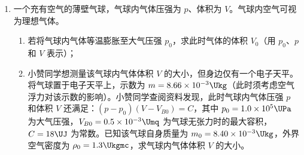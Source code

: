 \documentclass[\gkver]{gaokaozhenti}
\begin{document}
\begin{enumerate}
{\begin{enumerate}
	\item
	无作答要求

	\item
	无作答要求

	\item
	描点连线，如图（见详解）

	\item
	线性的

	\item
	0.120

	\item
	负方向

\end{enumerate}
}

\item
一个充有空气的薄壁气球，气球内气体压强为 $p$、体积为 $V$。气球内空气可视为理想气体。
\begin{enumerate}
	\item
	若将气球内气体等温膨胀至大气压强 $p_{0}$，求此时气体的体积 $V_{0}$（用 $p_{0}$、$p$ 和 $V$ 表示）；
	\item
	小赞同学想测量该气球内气体体积 $V$ 的大小，但身边仅有一个电子天平。将气球置于电子天平上，示数为 $m = 8.66\times10^{-3} \Ukg$（此时须考虑空气浮力对该示数的影响）。小赞同学查阅资料发现，此时气球内气体压强 $p$ 和体积 $V$ 还满足：$(p - p_{0})(V - V_{B0}) = C$，其中 $p_{0} = 1.0\times10^{5} \UPa$ 为大气压强，$V_{B0} = 0.5\times10^{-3} \Umq$ 为气球无张力时的最大容积，$C = 18 \UJ$ 为常数。已知该气球自身质量为 $m_{0} = 8.40\times10^{-3} \Ukg$，外界空气密度为 $\rho_{0} = 1.3 \Ukgmc$，求气球内气体体积 $V$ 的大小。
\end{enumerate}

\end{enumerate}
\end{document}
